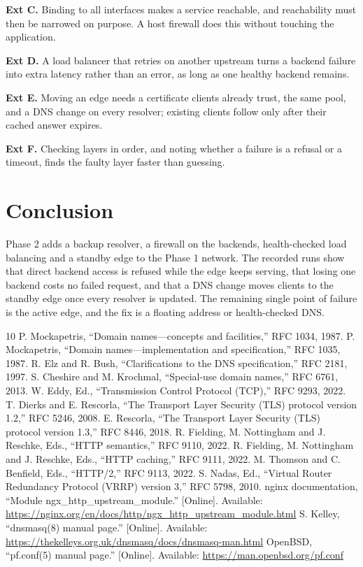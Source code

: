 \documentclass[conference]{IEEEtran}
\begin{document}
\textbf{Ext C.} Binding to all interfaces makes a service reachable, and
reachability must then be narrowed on purpose. A host firewall does this
without touching the application.

\textbf{Ext D.} A load balancer that retries on another upstream turns a
backend failure into extra latency rather than an error, as long as one
healthy backend remains.

\textbf{Ext E.} Moving an edge needs a certificate clients already trust,
the same pool, and a DNS change on every resolver; existing clients follow
only after their cached answer expires.

\textbf{Ext F.} Checking layers in order, and noting whether a failure is
a refusal or a timeout, finds the faulty layer faster than guessing.

\section{Conclusion}
Phase 2 adds a backup resolver, a firewall on the backends, health-checked
load balancing and a standby edge to the Phase 1 network.
The recorded runs show that direct backend access is refused while the
edge keeps serving, that losing one backend costs no failed request, and
that a DNS change moves clients to the standby edge once every resolver
is updated. The remaining single point of failure is the
active edge, and the fix is a floating address or health-checked DNS.

\begin{thebibliography}{10}
 P. Mockapetris, ``Domain names---concepts and facilities,'' RFC 1034, 1987.
 P. Mockapetris, ``Domain names---implementation and specification,'' RFC 1035, 1987.
 R. Elz and R. Bush, ``Clarifications to the DNS specification,'' RFC 2181, 1997.
 S. Cheshire and M. Krochmal, ``Special-use domain names,'' RFC 6761, 2013.
 W. Eddy, Ed., ``Transmission Control Protocol (TCP),'' RFC 9293, 2022.
 T. Dierks and E. Rescorla, ``The Transport Layer Security (TLS) protocol version 1.2,'' RFC 5246, 2008.
 E. Rescorla, ``The Transport Layer Security (TLS) protocol version 1.3,'' RFC 8446, 2018.
 R. Fielding, M. Nottingham and J. Reschke, Eds., ``HTTP semantics,'' RFC 9110, 2022.
 R. Fielding, M. Nottingham and J. Reschke, Eds., ``HTTP caching,'' RFC 9111, 2022.
 M. Thomson and C. Benfield, Eds., ``HTTP/2,'' RFC 9113, 2022.
 S. Nadas, Ed., ``Virtual Router Redundancy Protocol (VRRP) version 3,'' RFC 5798, 2010.
 nginx documentation, ``Module ngx\_http\_upstream\_module.'' [Online]. Available: \url{https://nginx.org/en/docs/http/ngx_http_upstream_module.html}
 S. Kelley, ``dnsmasq(8) manual page.'' [Online]. Available: \url{https://thekelleys.org.uk/dnsmasq/docs/dnsmasq-man.html}
 OpenBSD, ``pf.conf(5) manual page.'' [Online]. Available: \url{https://man.openbsd.org/pf.conf}
\end{thebibliography}
\end{document}
